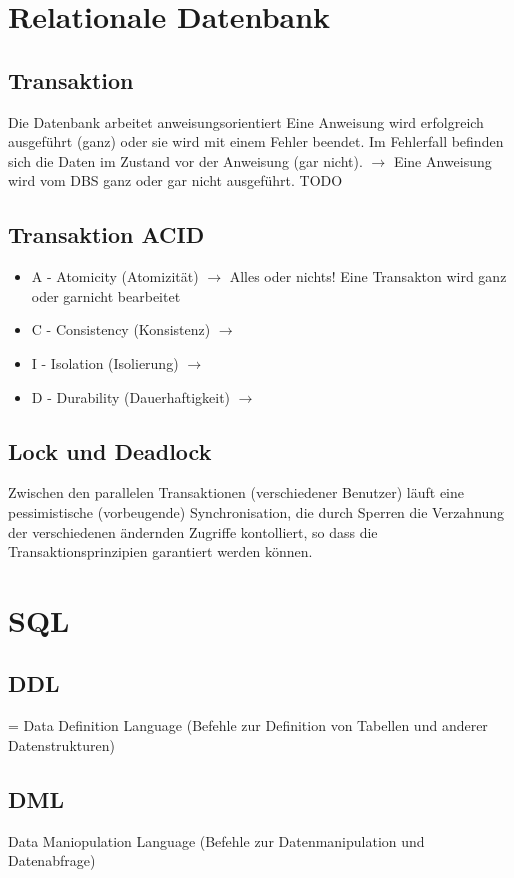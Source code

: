 \documentclass[a4paper,10pt]{scrartcl}
\begin{document}
\section{Relationale Datenbank}
\subsection{Transaktion}
Die Datenbank arbeitet anweisungsorientiert 
Eine Anweisung wird erfolgreich ausgeführt (ganz) oder sie wird mit einem Fehler beendet. Im Fehlerfall befinden sich die Daten im Zustand vor der Anweisung (gar nicht). \newline
$\rightarrow$ Eine Anweisung wird vom DBS ganz oder gar nicht ausgeführt.
TODO
\subsection{Transaktion ACID}
\begin{itemize}
    \item A - Atomicity (Atomizität) \newline
    $\rightarrow$ Alles oder nichts! Eine Transakton wird ganz oder garnicht bearbeitet
    \item C - Consistency (Konsistenz) \newline
    $\rightarrow$
    \item I - Isolation (Isolierung) \newline
    $\rightarrow$
    \item D - Durability (Dauerhaftigkeit) \newline
    $\rightarrow$
\end{itemize}
\subsection{Lock und Deadlock}
Zwischen den parallelen Transaktionen (verschiedener Benutzer) läuft eine pessimistische (vorbeugende) Synchronisation, die durch Sperren die Verzahnung der verschiedenen ändernden Zugriffe kontolliert, so dass die Transaktionsprinzipien garantiert werden können.
\newpage    
\section{SQL}
\subsection{DDL}
= Data Definition Language (Befehle zur Definition von Tabellen und anderer Datenstrukturen)
\subsection{DML}
Data Maniopulation Language (Befehle zur Datenmanipulation und Datenabfrage)
\end{document}
